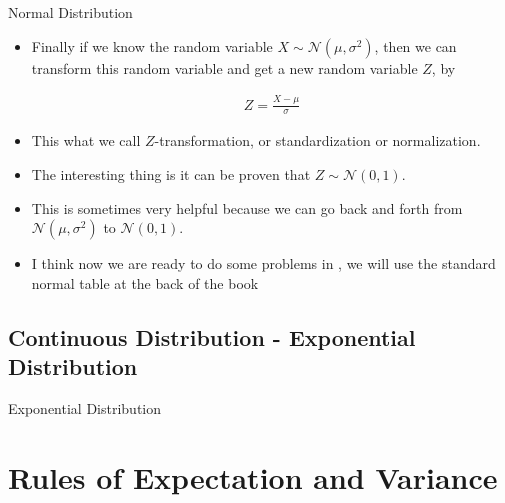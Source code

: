 \documentclass[8pt, usepdftitle=false]{beamer}
\begin{document}
\begin{frame}[allowframebreaks]{Normal Distribution}
\begin{itemize}
\item Finally if we know the random variable $X \sim \mathcal{N}(\mu, \sigma^2)$, then we can transform this random variable and get a new random variable $Z$, by

\begin{align*}
Z = \frac{X - \mu}{\sigma}
\end{align*}

\item This what we call \alert{$Z$-transformation, or standardization or normalization}.

\item The interesting thing is it can be proven that $Z \sim \mathcal{N}(0, 1)$.

\item This is sometimes very helpful because we can go back and forth from $\mathcal{N}(\mu, \sigma^2)$ to $\mathcal{N}(0, 1)$.


\item I think now we are ready to do some problems in \cite{anderson_statistics_2020}, we will use the standard normal table at the back of the book 

\end{itemize}


\end{frame}




\subsection{Continuous Distribution - Exponential Distribution}
\frame{\subsectionpage}


\begin{frame}{Exponential Distribution}



\end{frame}


\section{Rules of Expectation and Variance}
\frame{\sectionpage}
\end{document}
